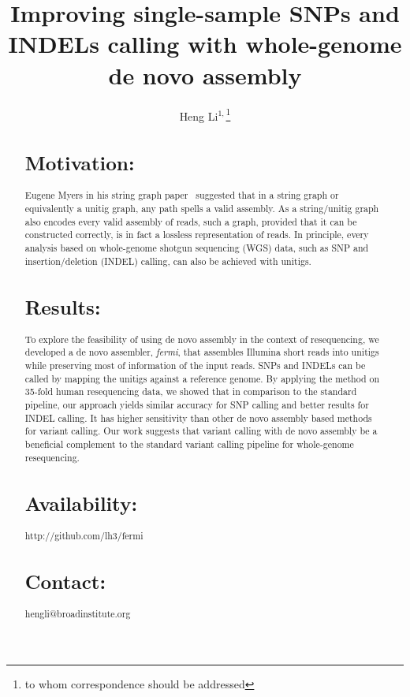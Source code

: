 \documentclass{bioinfo}
\begin{document}

\title[Variant calling with de novo assembly]{Improving single-sample SNPs and INDELs calling with
whole-genome de novo assembly}

\author[Li]{Heng Li$^{1,}$\footnote{to whom correspondence should be addressed}}

\address{$^1$Broad Institute, 7 Cambridge Center, Cambridge, MA 02142, USA}

\maketitle

\begin{abstract}

\section{Motivation:}
Eugene Myers in his string graph paper~\citep{Myers:2005bh} suggested that in a
string graph or equivalently a unitig graph, any path spells a valid assembly.
As a string/unitig graph also encodes every valid assembly of reads, such a
graph, provided that it can be constructed correctly, is in fact a lossless
representation of reads. In principle, every analysis based on whole-genome
shotgun sequencing (WGS) data, such as SNP and insertion/deletion (INDEL)
calling, can also be achieved with unitigs.

\section{Results:}
To explore the feasibility of using de novo assembly in the context of
resequencing, we developed a de novo assembler, \emph{fermi}, that assembles
Illumina short reads into unitigs while preserving most of information of the
input reads. SNPs and INDELs can be called by mapping the unitigs against a
reference genome. By applying the method on 35-fold human resequencing data,
we showed that in comparison to the standard pipeline, our approach yields
similar accuracy for SNP calling and better results for INDEL calling. It has
higher sensitivity than other de novo assembly based methods for variant
calling. Our work suggests that variant calling with de novo assembly be a
beneficial complement to the standard variant calling pipeline for whole-genome
resequencing.

\section{Availability:} http://github.com/lh3/fermi
\section{Contact:} hengli@broadinstitute.org
\end{abstract}
\end{document}
